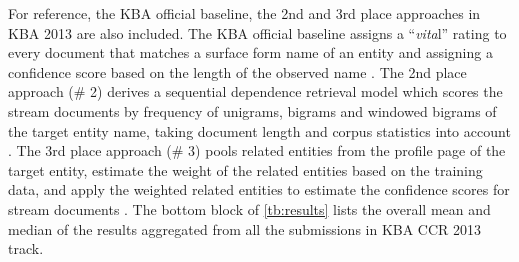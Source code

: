 \documentclass{sig-alternate}
\begin{document}
For reference, the KBA official baseline, the 2nd and 3rd place approaches in KBA 2013 are also included. The KBA official baseline assigns a ``{\em vita}l'' rating to every document that matches a surface form name of an entity and assigning a confidence score based on the length of the observed name \cite{overviewkba2013}. The 2nd place approach (\# 2) derives a sequential dependence retrieval model which scores the stream documents by frequency of unigrams, bigrams and windowed bigrams of the target entity name, taking document length and corpus statistics into account \cite{Dietz:2013:KBA}. The 3rd place approach (\# 3) pools related entities from the profile page of the target entity, estimate the weight of the related entities based on the training data, and apply the weighted related entities to estimate the confidence scores for stream documents \cite{UdelFang:2013:KBA}. The bottom block of \autoref{tb:results} lists the overall mean and median of the results aggregated from all the submissions in KBA CCR 2013 track.
\end{document}
